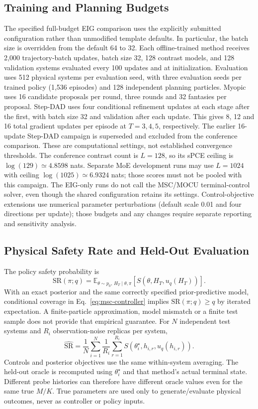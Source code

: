 \documentclass[journal]{IEEEtran}
\newcommand{\E}{\mathbb{E}}
\begin{document}
\subsection{Training and Planning Budgets}
The specified full-budget EIG comparison uses the explicitly submitted
configuration rather than unmodified template defaults. In particular, the
batch size is overridden from the default 64 to 32. Each offline-trained
method receives 2,000 trajectory-batch updates,
batch size 32, 128 contrast models, and 128 validation systems evaluated every
100 updates and at initialization. Evaluation uses 512 physical systems per evaluation
seed, with three evaluation seeds per trained policy (1,536 episodes) and
128 independent planning particles. Myopic uses 16 candidate
proposals per round, three rounds and 32 fantasies per proposal. Step-DAD uses
four conditional refinement updates at each stage after the first,
with batch size 32 and validation after each update. This gives 8, 12 and
16 total gradient updates per episode at $T=3,4,5$, respectively. The earlier
16-update Step-DAD campaign is superseded and excluded from the conference comparison. These are
computational settings, not established convergence thresholds. The
conference contrast count is $L=128$, so its sPCE ceiling is
$\log(129)\simeq4.8598$ nats. Separate MoE development runs may use
$L=1024$ with ceiling $\log(1025)\simeq6.9324$ nats; those scores must not
be pooled with this campaign. The EIG-only
runs do not call the MSC/MOCU terminal-control solver, even though the shared
configuration retains its settings. Control-objective extensions use numerical
parameter perturbations (default scale 0.01 and four directions per update);
those budgets and any changes require separate reporting and sensitivity
analysis.

\subsection{Physical Safety Rate and Held-Out Evaluation}
The policy safety probability is
\begin{equation}
\mathrm{SR}(\pi;q)=\E_{\theta\sim p_0,\,H_T\mid\theta,\pi}
[S(\theta,H_T,u_q(H_T))].
\label{eq:safety-rate}
\end{equation}
With an exact posterior and the same correctly specified prior-predictive
model, conditional coverage in Eq.~\eqref{eq:msc-controller} implies
$\mathrm{SR}(\pi;q)\ge q$ by iterated expectation. A finite-particle
approximation, model mismatch or a finite test sample does not provide that
empirical guarantee.
For $N$ independent test systems and $R_i$ observation-noise replicas per system,
\begin{equation}
\widehat{\mathrm{SR}}=\frac1N\sum_{i=1}^N\frac1{R_i}
\sum_{r=1}^{R_i}S(\theta_i^\star,h_{i,r},u_q(h_{i,r})).
\label{eq:empirical-safety}
\end{equation}
Controls and posterior objectives use the same within-system averaging.
The held-out oracle is recomputed using $\theta_i^\star$ and that method's
actual terminal state. Different probe histories can therefore have different
oracle values even for the same true $M/K$. True parameters are used only
to generate/evaluate physical outcomes, never as controller or policy inputs.
\end{document}

